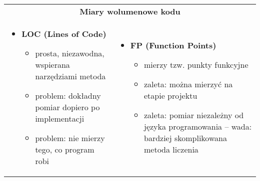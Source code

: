 \documentclass[../main.tex]{subfiles}
\begin{document}
    \begin{table}[H]
        \begin{center}
            \begin{tabular}{p{8cm} p{8cm}}
                \multicolumn{2}{c}{\textbf{Miary wolumenowe kodu}} \\

                \begin{itemize}
                    \item \textbf{LOC (Lines of Code)}
                    \begin{itemize}
                        \item prosta, niezawodna, wspierana narzędziami metoda
                        \item problem: dokładny pomiar dopiero po implementacji
                        \item problem: nie mierzy tego, co program robi
                    \end{itemize}
                \end{itemize}
                &
                \begin{itemize}
                    \item \textbf{FP (Function Points)}
                    \begin{itemize}
                        \item mierzy tzw. punkty funkcyjne
                        \item zaleta: można mierzyć na etapie projektu
                        \item zaleta: pomiar niezależny od języka programowania – wada: bardziej skomplikowana metoda liczenia
                    \end{itemize}
                \end{itemize}
            \end{tabular}
        \end{center}
    \end{table}
\end{document}
